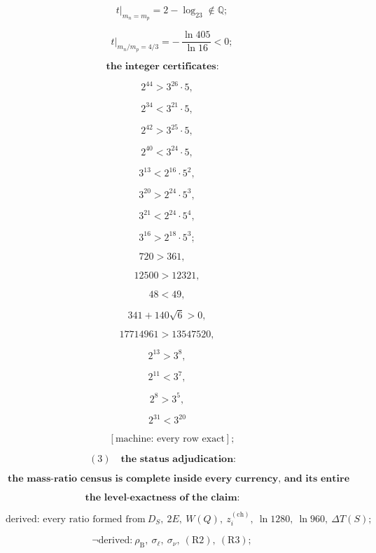 \documentclass[11pt,openany]{report}
\theoremstyle{canonplain}
\theoremstyle{canondef}
\begin{document}
\[
\qquad t\big|_{m_n=m_p}=2-\log_23\notin\mathbb Q;
\]

\[
\qquad t\big|_{m_n/m_p=4/3}=-\,\frac{\ln405}{\ln16}<0;
\]

\[
\textbf{the integer certificates:}
\]

\[
\quad 2^{44}>3^{26}\!\cdot\!5,
\]

\[
\quad 2^{34}<3^{21}\!\cdot\!5,
\]

\[
\quad 2^{42}>3^{25}\!\cdot\!5,
\]

\[
\quad 2^{40}<3^{24}\!\cdot\!5,
\]

\[
\quad 3^{13}<2^{16}\!\cdot\!5^2,
\]

\[
\quad 3^{20}>2^{24}\!\cdot\!5^3,
\]

\[
\quad 3^{21}<2^{24}\!\cdot\!5^4,
\]

\[
\quad 3^{16}>2^{18}\!\cdot\!5^3;
\]

\[
720>361,
\]

\[
\quad 12500>12321,
\]

\[
\quad 48<49,
\]

\[
\quad 341+140\sqrt6>0,
\]

\[
\quad 17714961>13547520,
\]

\[
\quad 2^{13}>3^8,
\]

\[
\quad 2^{11}<3^7,
\]

\[
\quad 2^8>3^5,
\]

\[
\quad 2^{31}<3^{20}
\]

\[
\qquad [\text{machine: every row exact}];
\]

\[
(3)\quad\textbf{the status adjudication:}
\]

\[
\qquad \boxed{\ \textbf{the mass-ratio census is complete inside every currency, and its entire cross-currency obstruction is three undeclared dimensionless numbers and one attachment}\ }
\]

\[
\textbf{the level-exactness of the claim:}
\]

\[
\qquad \text{derived: every ratio formed from}\ D_S,\ 2E,\ W(Q),\ z_i^{(\mathrm{ch})},\ \ln1280,\ \ln960,\ \Delta T(S);
\]

\[
\qquad \neg\text{derived:}\ \rho_{\mathrm B},\ \sigma_\ell,\ \sigma_\nu,\ (\mathrm{R2}),\ (\mathrm{R3});
\]
\end{document}
